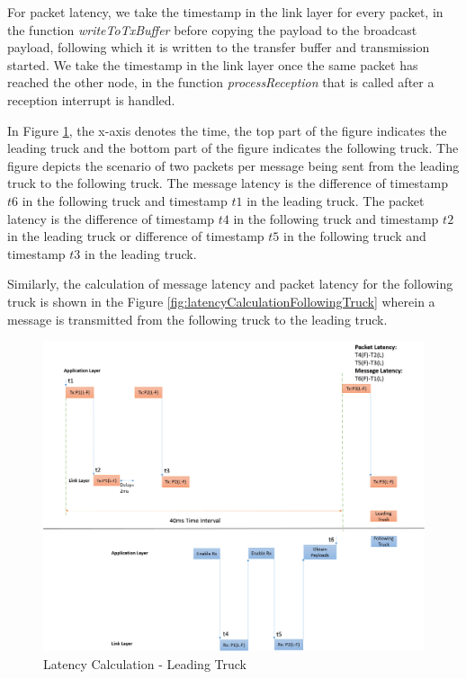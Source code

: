 For packet latency, we take the timestamp in the link layer for every packet, in the function \emph{writeToTxBuffer} before copying the payload to the broadcast payload, following which it is written to the transfer buffer and transmission started.  We take the timestamp in the link layer once the same packet has reached the other node, in the function \emph{processReception} that is called after a reception interrupt is handled. 

In Figure \ref{fig:latencyCalculationLeadingTruck}, the x-axis denotes the time, the top part of the figure indicates the leading truck and the bottom part of the figure indicates the following truck. The figure depicts the scenario of two packets per message being sent from the leading truck to the following truck. The message latency is the difference of timestamp $t6$ in the following truck and timestamp $t1$ in the leading truck. The packet latency is the difference of timestamp $t4$ in the following truck and timestamp $t2$ in the leading truck or difference of timestamp $t5$ in the following truck and timestamp $t3$ in the leading truck.

Similarly, the calculation of message latency and packet latency for the following truck is shown in the Figure \ref{fig:latencyCalculationFollowingTruck} wherein a message is transmitted from the following truck to the leading truck.
\begin{figure}[h!]
    \includegraphics[width=1\textwidth]{figures/LatencyCalculationLeadingTruck}
    \centering
    \caption{Latency Calculation - Leading Truck}
    \label{fig:latencyCalculationLeadingTruck}    
\end{figure}

